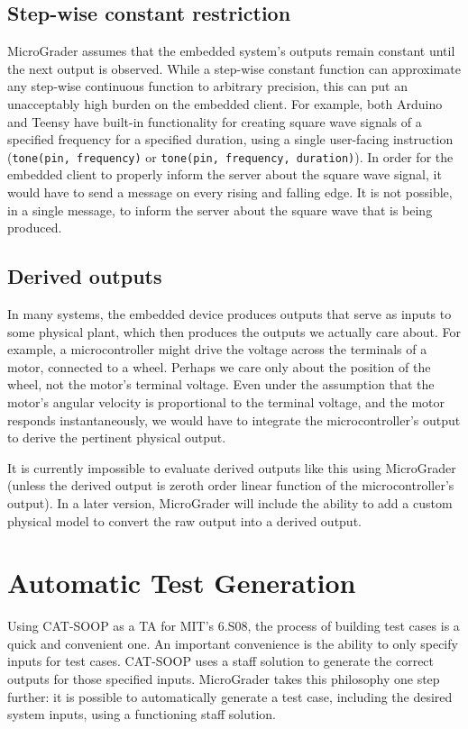 \documentclass[12pt]{article}
\begin{document}
\subsection{Step-wise constant restriction}
MicroGrader assumes that the embedded system's outputs remain constant until the next output is observed.  While a step-wise constant function can approximate any step-wise continuous function to arbitrary precision, this can put an unacceptably high burden on the embedded client.  For example, both Arduino and Teensy have built-in functionality for creating square wave signals of a specified frequency for a specified duration, using a single user-facing instruction (\texttt{tone(pin, frequency)} or \texttt{tone(pin, frequency, duration)}).  In order for the embedded client to properly inform the server about the square wave signal, it would have to send a message on every rising and falling edge.  It is not possible, in a single message, to inform the server about the square wave that is being produced.

\subsection{Derived outputs}
\label{sec:derived-outputs}
In many systems, the embedded device produces outputs that serve as inputs to some physical plant, which then produces the outputs we actually care about.  For example, a microcontroller might drive the voltage across the terminals of a motor, connected to a wheel.  Perhaps we care only about the position of the wheel, not the motor's terminal voltage.  Even under the assumption that the motor's angular velocity is proportional to the terminal voltage, and the motor responds instantaneously, we would have to integrate the microcontroller's output to derive the pertinent physical output.

It is currently impossible to evaluate derived outputs like this using MicroGrader (unless the derived output is zeroth order linear function of the microcontroller's output).  In a later version, MicroGrader will include the ability to add a custom physical model to convert the raw output into a derived output.

\newpage
\section{Automatic Test Generation}
\label{sec:scaffold}

Using CAT-SOOP as a TA for MIT's 6.S08, the process of building test cases is a quick and convenient one.  An important convenience is the ability to only specify inputs for test cases.  CAT-SOOP uses a staff solution to generate the correct outputs for those specified inputs.  MicroGrader takes this philosophy one step further: it is possible to automatically generate a test case, including the desired system inputs, using a functioning staff solution.
\end{document}
